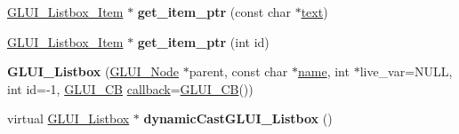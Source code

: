 \begin{DoxyCompactItemize}
\item 
\hypertarget{class_g_l_u_i___listbox_a12428a6ca8ce1018c2b191e0eee774ce}{\hyperlink{class_g_l_u_i___listbox___item}{G\+L\+U\+I\+\_\+\+Listbox\+\_\+\+Item} $\ast$ {\bfseries get\+\_\+item\+\_\+ptr} (const char $\ast$\hyperlink{class_g_l_u_i___control_af0d60e9736f4dbc34e9a536e75876d72}{text})}\label{class_g_l_u_i___listbox_a12428a6ca8ce1018c2b191e0eee774ce}

\item 
\hypertarget{class_g_l_u_i___listbox_affa1e8cb4df6d4e2c4d1242a6af8e6be}{\hyperlink{class_g_l_u_i___listbox___item}{G\+L\+U\+I\+\_\+\+Listbox\+\_\+\+Item} $\ast$ {\bfseries get\+\_\+item\+\_\+ptr} (int id)}\label{class_g_l_u_i___listbox_affa1e8cb4df6d4e2c4d1242a6af8e6be}

\item 
\hypertarget{class_g_l_u_i___listbox_a04f341fb0ac378ae1fc09c18f88a393c}{{\bfseries G\+L\+U\+I\+\_\+\+Listbox} (\hyperlink{class_g_l_u_i___node}{G\+L\+U\+I\+\_\+\+Node} $\ast$parent, const char $\ast$\hyperlink{class_g_l_u_i___control_aa95b97d50df45335fc33f0af03958eb3}{name}, int $\ast$live\+\_\+var=N\+U\+L\+L, int id=-\/1, \hyperlink{class_g_l_u_i___c_b}{G\+L\+U\+I\+\_\+\+C\+B} \hyperlink{class_g_l_u_i___control_a96060fe0cc6d537e736dd6eef78e24ab}{callback}=\hyperlink{class_g_l_u_i___c_b}{G\+L\+U\+I\+\_\+\+C\+B}())}\label{class_g_l_u_i___listbox_a04f341fb0ac378ae1fc09c18f88a393c}

\item 
\hypertarget{class_g_l_u_i___listbox_a3582bf712cc2f0ccdb8f075eca314628}{virtual \hyperlink{class_g_l_u_i___listbox}{G\+L\+U\+I\+\_\+\+Listbox} $\ast$ {\bfseries dynamic\+Cast\+G\+L\+U\+I\+\_\+\+Listbox} ()}\label{class_g_l_u_i___listbox_a3582bf712cc2f0ccdb8f075eca314628}

\end{DoxyCompactItemize}
